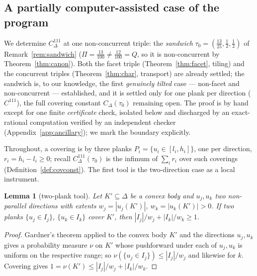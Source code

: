 \documentclass[11pt,reqno]{amsart}
\theoremstyle{plain}
\newtheorem{lemma}[theorem]{Lemma}
\theoremstyle{definition}
\theoremstyle{remark}
\begin{document}
\subsection*{A partially computer-assisted case of the program}
We determine $C^{111}_\Delta$ at one non-concurrent triple: the
\emph{sandwich} $\tau_0=(\tfrac{13}{25},\tfrac12,\tfrac12)$ of
Remark~\ref{rem:sandwich} ($\Pi=\tfrac{13}{100}\ne\tfrac{12}{100}=Q$, so it is
non-concurrent by Theorem~\ref{thm:canon}). Both the facet triple
(Theorem~\ref{thm:facet}, tiling) and the concurrent triples
(Theorem~\ref{thm:char}, transport) are already settled; the sandwich is, to
our knowledge, the first \emph{genuinely tilted} case --- non-facet and
non-concurrent --- established, and it is settled only for one plank per
direction ($C^{111}$), the full covering constant $C_\Delta(\tau_0)$ remaining
open. The proof is by hand except for one finite \emph{certificate} check,
isolated below and discharged by an exact-rational computation verified by an
independent checker (Appendix~\ref{app:ancillary}); we mark the boundary
explicitly.

Throughout, a covering is by three planks $P_i=\{u_i\in[l_i,h_i]\}$, one per
direction, $r_i=h_i-l_i\ge0$; recall $C^{111}_\Delta(\tau_0)$ is the infimum of
$\sum_i r_i$ over such coverings (Definition~\ref{def:covconst}). The first
tool is the two-direction case as a local instrument.

\begin{lemma}[two-plank tool]\label{lem:twoplank}
Let $K'\subseteq\Delta$ be a convex body and $u_j,u_k$ two non-parallel
directions with extents $w_j=|u_j(K')|$, $w_k=|u_k(K')|>0$. If two planks
$\{u_j\in I_j\}$, $\{u_k\in I_k\}$ cover $K'$, then
$|I_j|/w_j+|I_k|/w_k\ge1$.
\end{lemma}
\begin{proof}
Gardner's theorem \cite[Theorem~1]{Gardner88} applied to the convex body $K'$
and the directions $u_j,u_k$ gives a probability measure $\nu$ on $K'$ whose
pushforward under each of $u_j,u_k$ is uniform on the respective range; so
$\nu(\{u_j\in I_j\})\le|I_j|/w_j$ and likewise for $k$. Covering gives
$1=\nu(K')\le|I_j|/w_j+|I_k|/w_k$.
\end{proof}
\end{document}
